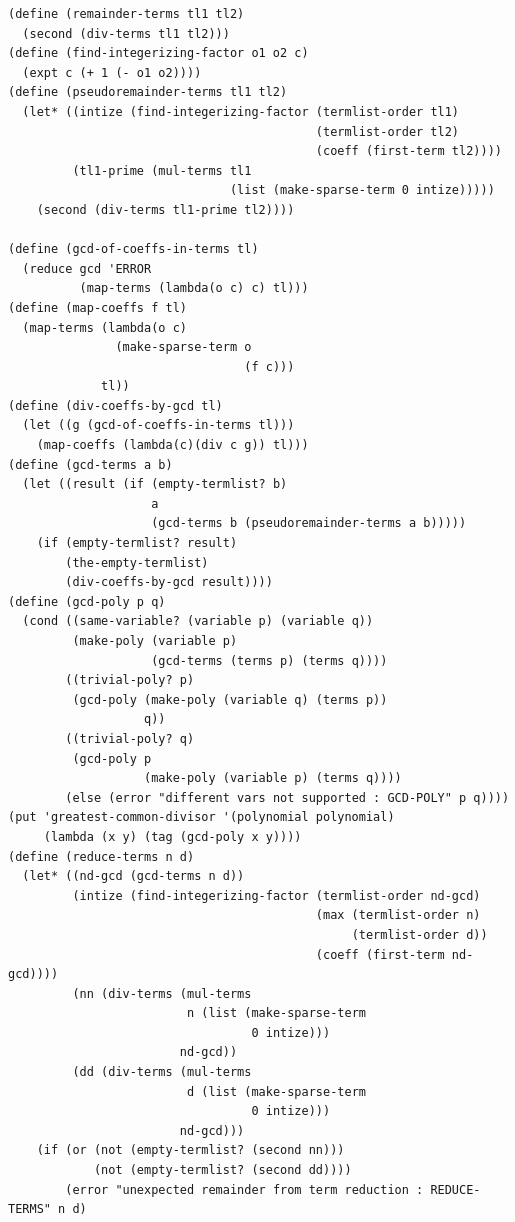 \documentclass[final,fleqn,titlepage,twoside]{article}
\begin{document}
\begin{verbatim}
(define (remainder-terms tl1 tl2)
  (second (div-terms tl1 tl2)))
(define (find-integerizing-factor o1 o2 c)
  (expt c (+ 1 (- o1 o2))))
(define (pseudoremainder-terms tl1 tl2)
  (let* ((intize (find-integerizing-factor (termlist-order tl1)
                                           (termlist-order tl2)
                                           (coeff (first-term tl2))))
         (tl1-prime (mul-terms tl1
                               (list (make-sparse-term 0 intize)))))
    (second (div-terms tl1-prime tl2))))

(define (gcd-of-coeffs-in-terms tl)
  (reduce gcd 'ERROR
          (map-terms (lambda(o c) c) tl)))
(define (map-coeffs f tl)
  (map-terms (lambda(o c)
               (make-sparse-term o
                                 (f c)))
             tl))
(define (div-coeffs-by-gcd tl)
  (let ((g (gcd-of-coeffs-in-terms tl)))
    (map-coeffs (lambda(c)(div c g)) tl)))
(define (gcd-terms a b)
  (let ((result (if (empty-termlist? b)
                    a
                    (gcd-terms b (pseudoremainder-terms a b)))))
    (if (empty-termlist? result)
        (the-empty-termlist)
        (div-coeffs-by-gcd result))))
(define (gcd-poly p q)
  (cond ((same-variable? (variable p) (variable q))
         (make-poly (variable p)
                    (gcd-terms (terms p) (terms q))))
        ((trivial-poly? p)
         (gcd-poly (make-poly (variable q) (terms p))
                   q))
        ((trivial-poly? q)
         (gcd-poly p
                   (make-poly (variable p) (terms q))))
        (else (error "different vars not supported : GCD-POLY" p q))))
(put 'greatest-common-divisor '(polynomial polynomial)
     (lambda (x y) (tag (gcd-poly x y))))
(define (reduce-terms n d)
  (let* ((nd-gcd (gcd-terms n d))
         (intize (find-integerizing-factor (termlist-order nd-gcd)
                                           (max (termlist-order n)
                                                (termlist-order d))
                                           (coeff (first-term nd-gcd))))
         (nn (div-terms (mul-terms
                         n (list (make-sparse-term
                                  0 intize)))
                        nd-gcd))
         (dd (div-terms (mul-terms
                         d (list (make-sparse-term
                                  0 intize)))
                        nd-gcd)))
    (if (or (not (empty-termlist? (second nn)))
            (not (empty-termlist? (second dd))))
        (error "unexpected remainder from term reduction : REDUCE-TERMS" n d)

\end{verbatim}
\end{document}

